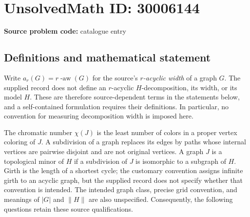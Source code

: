 \documentclass[11pt]{article}
\begin{document}
\section*{UnsolvedMath ID: 30006144}
\textbf{Source problem code:} catalogue entry
\subsection{Definitions and mathematical statement}
Write \(a_r(G)=r\operatorname{-aw}(G)\) for the source's \emph{\(r\)-acyclic width} of a graph \(G\). The supplied record does not define an \(r\)-acyclic \(H\)-decomposition, its width, or its model \(H\). These are therefore source-dependent terms in the statements below, and a self-contained formulation requires their definitions. In particular, no convention for measuring decomposition width is imposed here.

The chromatic number \(\chi(J)\) is the least number of colors in a proper vertex coloring of \(J\). A subdivision of a graph replaces its edges by paths whose internal vertices are pairwise disjoint and are not original vertices. A graph \(J\) is a topological minor of \(H\) if a subdivision of \(J\) is isomorphic to a subgraph of \(H\). Girth is the length of a shortest cycle; the customary convention assigns infinite girth to an acyclic graph, but the supplied record does not specify whether that convention is intended. The intended graph class, precise grid convention, and meanings of \(|G|\) and \(\lVert H\rVert\) are also unspecified. Consequently, the following questions retain these source qualifications.
\end{document}
